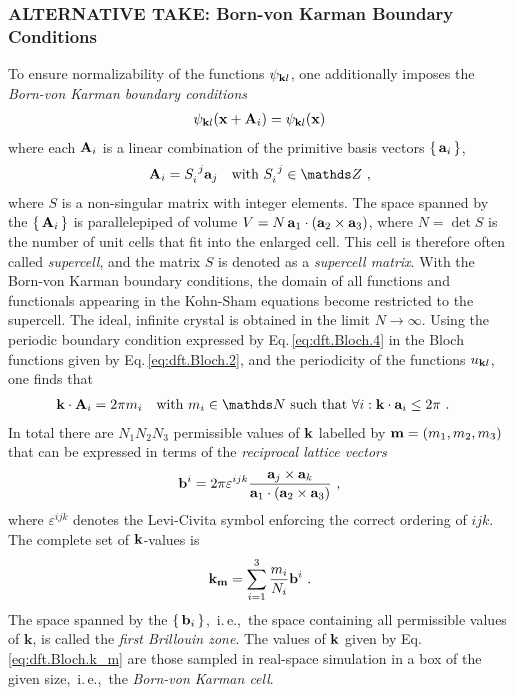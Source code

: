 \documentclass[a4paper,12pt]{book}
\renewcommand{\b}[1]{\boldsymbol{#1}}
\newcommand{\im}{{\rm i}}
\begin{document}
\subsubsection{ALTERNATIVE TAKE: Born-von Karman Boundary Conditions}
To ensure normalizability of the functions $\psi_{{\bf k}l}$, one additionally imposes the \emph{Born-von Karman boundary conditions}
\begin{align}
\psi_{{\bf k}l} ({\bf x} + {\bf A}_i) 
= \psi_{{\bf k}l} ({\bf x})
\label{eq:dft.Bloch.4}
\end{align}
where each ${\bf A}_i$ is a linear combination of the primitive basis vectors $\set{{\bf a}_i}$,
\begin{align}
	{\bf A}_i = S_i^{~j} {\bf a}_j\quad\text{with } S_i^{~j} \in \mathds Z~,
\end{align}
where $S$ is a non-singular matrix with integer elements. The space spanned by the $\set{{\bf A}_i}$ is parallelepiped of volume $V = N \, {\bf a}_1 \cdot ({\bf a}_2 \times {\bf a}_3)$, where $N = \det S$ is the number of unit cells that fit into the enlarged cell. This cell is therefore often called \emph{supercell}, and the matrix $S$ is denoted as a \emph{supercell matrix}.
With the Born-von Karman boundary conditions, the domain of all functions and functionals appearing in the Kohn-Sham equations become restricted to the supercell. The ideal, infinite crystal is obtained in the limit $N \rightarrow \infty$.
Using the periodic boundary condition expressed by Eq.\,\eqref{eq:dft.Bloch.4} in the Bloch functions given by Eq.\,\eqref{eq:dft.Bloch.2}, and the periodicity of the functions $u_{{\bf k} l}$, one finds that
\begin{align}
{\bf k} \cdot {\bf A}_i
&= 2 \pi m_i\quad\text{with } m_i \in \mathds N \text{ such that } 
	\forall i: {\bf k} \cdot {\bf a}_i \leq 2 \pi~.
\label{eq:dft.Bloch.5}
\end{align}
In total there are $N_1 N_2 N_3$ permissible values of $\bf k$ labelled by ${\bf m} = (m_1, m_2, m_3)$ that can be expressed in terms of the \emph{reciprocal lattice vectors}~\cite{Sands2002}
\begin{align}
{\bf b}^i 
= 2 \pi \varepsilon^{ijk} \frac{{\bf a}_j \times {\bf a}_k}{{\bf a}_1 \cdot ({\bf a}_2 \times {\bf a}_3)} ~,
\label{eq:dft.Bloch.bi}
\end{align}
where $\varepsilon^{ijk}$ denotes the Levi-Civita symbol enforcing the correct ordering of $ijk$. The complete set of $\bf k$-values is
\begin{align}
{\bf k}_{\bf m} 
= \sum_{i=1}^3 \frac{m_i}{N_i} {\bf b}^i~.
\label{eq:dft.Bloch.k_m}
\end{align}
The space spanned by the $\set{{\bf b}_i}$,~i.\,e.,~the space containing all permissible values of $\b k$, is called the \emph{first Brillouin zone}. The values of $\bf k$ given by Eq.\,\eqref{eq:dft.Bloch.k_m} are those sampled in real-space simulation in a box of the given size,~i.\,e.,~the \emph{Born-von Karman cell}.
\end{document}
